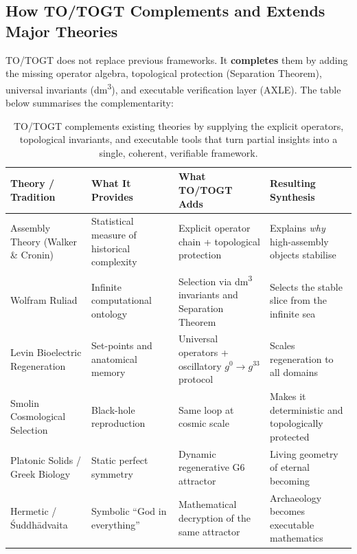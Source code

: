 \subsection{How TO/TOGT Complements and Extends Major Theories}

TO/TOGT does not replace previous frameworks. It \textbf{completes} them by adding the missing operator algebra, topological protection (Separation Theorem), universal invariants (dm\textsuperscript{3}), and executable verification layer (AXLE). The table below summarises the complementarity:

\begin{table}[htbp]        %
\centering
\small
\begin{tabularx}{\textwidth}{lXXX}
\toprule
\textbf{Theory / Tradition} &
\textbf{What It Provides} &
\textbf{What TO/TOGT Adds} &
\textbf{Resulting Synthesis} \\
\midrule
Assembly Theory (Walker \& Cronin) &
Statistical measure of historical complexity &
Explicit operator chain + topological protection &
Explains \emph{why} high-assembly objects stabilise \\
Wolfram Ruliad &
Infinite computational ontology &
Selection via dm\textsuperscript{3} invariants and Separation Theorem &
Selects the stable slice from the infinite sea \\
Levin Bioelectric Regeneration &
Set-points and anatomical memory &
Universal operators + oscillatory $g^0 \to g^{33}$ protocol &
Scales regeneration to all domains \\
Smolin Cosmological Selection &
Black-hole reproduction &
Same loop at cosmic scale &
Makes it deterministic and topologically protected \\
Platonic Solids / Greek Biology &
Static perfect symmetry &
Dynamic regenerative G6 attractor &
Living geometry of eternal becoming \\
Hermetic / \'{S}uddh\=advaita &
Symbolic ``God in everything'' &
Mathematical decryption of the same attractor &
Archaeology becomes executable mathematics \\
\bottomrule
\end{tabularx}
\caption{TO/TOGT complements existing theories by supplying the explicit operators, topological invariants, and executable tools that turn partial insights into a single, coherent, verifiable framework.}
\label{tab:theory-comparison}
\end{table}

